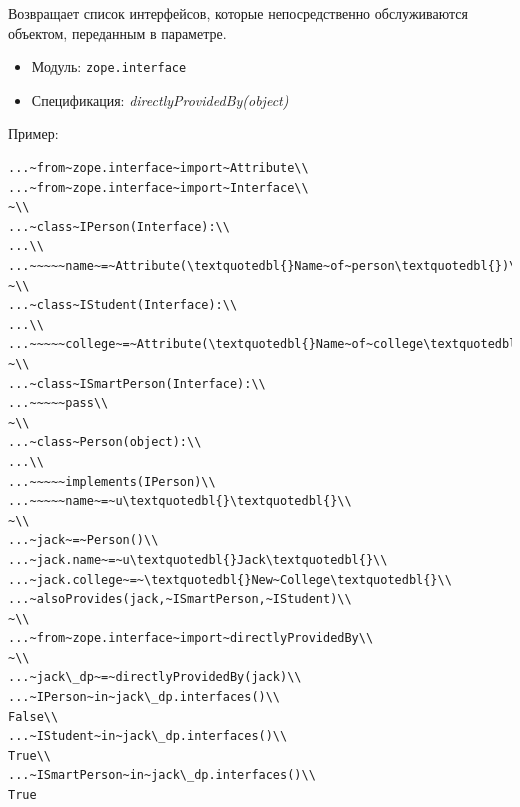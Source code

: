 \documentclass[a4paper,openany,twoside,draft]{book}
\providecommand*{\DUroletitlereference}[1]{\textsl{#1}}
\begin{document}
Возвращает список интерфейсов, которые непосредственно обслуживаются
объектом, переданным в параметре.

\begin{itemize}

\item Модуль: \texttt{zope.interface}

\item Спецификация: \DUroletitlereference{directlyProvidedBy(object)}

\end{itemize}

Пример:

\begin{verbatim}
...~from~zope.interface~import~Attribute\\
...~from~zope.interface~import~Interface\\
~\\
...~class~IPerson(Interface):\\
...\\
...~~~~~name~=~Attribute(\textquotedbl{}Name~of~person\textquotedbl{})\\
~\\
...~class~IStudent(Interface):\\
...\\
...~~~~~college~=~Attribute(\textquotedbl{}Name~of~college\textquotedbl{})\\
~\\
...~class~ISmartPerson(Interface):\\
...~~~~~pass\\
~\\
...~class~Person(object):\\
...\\
...~~~~~implements(IPerson)\\
...~~~~~name~=~u\textquotedbl{}\textquotedbl{}\\
~\\
...~jack~=~Person()\\
...~jack.name~=~u\textquotedbl{}Jack\textquotedbl{}\\
...~jack.college~=~\textquotedbl{}New~College\textquotedbl{}\\
...~alsoProvides(jack,~ISmartPerson,~IStudent)\\
~\\
...~from~zope.interface~import~directlyProvidedBy\\
~\\
...~jack\_dp~=~directlyProvidedBy(jack)\\
...~IPerson~in~jack\_dp.interfaces()\\
False\\
...~IStudent~in~jack\_dp.interfaces()\\
True\\
...~ISmartPerson~in~jack\_dp.interfaces()\\
True
\end{verbatim}
\end{document}
